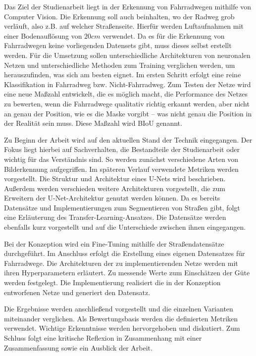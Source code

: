 Das Ziel der Studienarbeit liegt in der Erkennung von Fahrradwegen mithilfe von Computer Vision.
Die Erkennung soll auch beinhalten, wo der Radweg grob verläuft, also z.B. auf welcher Straßenseite.
Hierfür werden Luftaufnahmen mit einer Bodenauflösung von $20 cm$ verwendet.
Da es für die Erkennung von Fahrradwegen keine vorliegenden Datensets gibt, muss dieses selbst erstellt werden.
Für die Umsetzung sollen unterschiedliche Architekturen von neuronalen Netzen und unterschiedliche Methoden 
zum Training verglichen werden, um herauszufinden, was sich am besten eignet. 
Im ersten Schritt erfolgt eine reine Klassifikation in Fahrradweg bzw. Nicht-Fahrradweg.
Zum Testen der Netze wird eine neue Maßzahl entwickelt, die es möglich macht, 
die Performance des Netzes zu bewerten, wenn die Fahrradwege qualitativ richtig 
erkannt werden, aber nicht an genau der Position, wie es die Maske vorgibt -- 
was nicht genau die Position in der Realität sein muss.
Diese Maßzahl wird \ac{BIoU} genannt.


Zu Beginn der Arbeit wird auf den aktuellen Stand der Technik eingegangen.
Der Fokus liegt hierbei auf Sachverhalten, die Bestandteile der Studienarbeit oder wichtig für das Verständnis sind.
So werden zunächst verschiedene Arten von Bilderkennung aufgegriffen.
Im späteren Verlauf verwendete Metriken werden vorgestellt.
Die Struktur und Architektur eines U-Nets wird beschrieben. Außerdem werden verschieden weitere Architekturen 
vorgestellt, die zum Erweitern der U-Net-Architektur genutzt werden können.
Da es bereits Datensätze und Implementierungen zum Segmentieren von Straßen gibt, folgt eine Erläuterung des Transfer-Learning-Ansatzes.
Die Datensätze werden ebenfalls kurz vorgestellt und auf die Unterschiede zwischen ihnen eingegangen.

Bei der Konzeption wird ein Fine-Tuning mithilfe der Straßendatensätze durchgeführt.
Im Anschluss erfolgt die Erstellung eines eigenen Datensatzes für Fahrradwege.
Die Architekturen der zu implementierenden Netze werden mit ihren Hyperparametern erläutert.
Zu messende Werte zum Einschätzen der Güte werden festgelegt.
Die Implementierung realisiert die in der Konzeption entworfenen Netze und generiert den Datensatz.

Die Ergebnisse werden anschließend vorgestellt und die einzelnen Varianten miteinander verglichen.
Als Bewertungsbasis werden die definierten Metriken verwendet.
Wichtige Erkenntnisse werden hervorgehoben und diskutiert. 
Zum Schluss folgt eine kritische Reflexion in Zusammenhang mit einer Zusammenfassung sowie ein Ausblick der Arbeit.